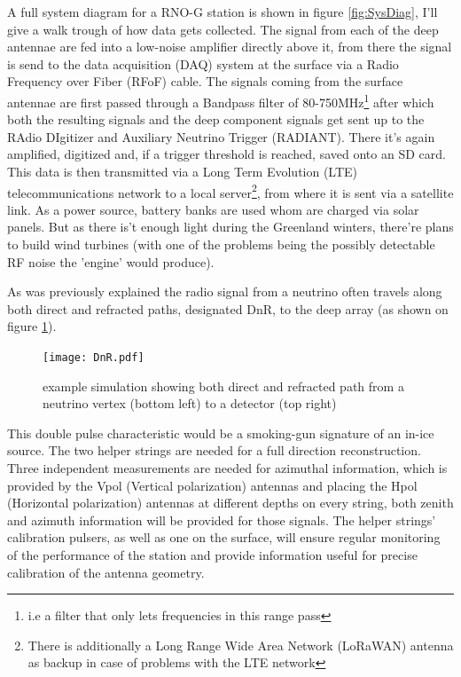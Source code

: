 A full system diagram for a RNO-G station is shown in figure \ref{fig:SysDiag},
I'll give a walk trough of how data gets collected.  The signal from each of
the deep antennae are fed into a low-noise amplifier directly above it, from
there the signal is send to the data acquisition (DAQ) system at the surface
via a Radio Frequency over Fiber (RFoF) cable.  The signals coming from the
surface antennae are first passed through a Bandpass filter of
80-750MHz\footnote{i.e a filter that only lets frequencies in this range pass}
after which both the resulting signals and the deep component signals get sent
up to the RAdio DIgitizer and Auxiliary Neutrino Trigger (RADIANT). There it's
again amplified, digitized and, if a trigger threshold is reached, saved onto
an SD card. This data is then transmitted via a Long Term Evolution (LTE)
telecommunications network to a local server\footnote{There is additionally a
Long Range Wide Area Network (LoRaWAN) antenna as backup in case of problems
with the LTE network}, from where it is sent via a satellite link.
As a power source, battery banks are used whom are charged via solar panels.
But as there is't enough light during the Greenland winters, there're plans to
build wind turbines (with one of the problems being the possibly detectable RF
noise the 'engine' would produce).

As was previously explained the radio signal from a neutrino often travels
along both direct and refracted paths, designated DnR, to the deep array (as shown
on figure \ref{fig:DnR}).
\begin{figure}
  \centering
  \texttt{[image: DnR.pdf]}
  \caption{example simulation showing both direct and refracted path from a neutrino vertex (bottom left) to a detector (top right)}
  \label{fig:DnR}
\end{figure}
This double pulse characteristic would be a smoking-gun signature of an in-ice
source. The two helper strings are needed for a full direction reconstruction.
Three independent measurements are needed for azimuthal information, which is
provided by the Vpol (Vertical polarization) antennas and placing the Hpol
(Horizontal polarization) antennas at different depths on every string, both
zenith and azimuth information will be provided for those signals. The helper
strings' calibration pulsers, as well as one on the surface, will ensure
regular monitoring of the performance of the station and provide information
useful for precise calibration of the antenna geometry.
